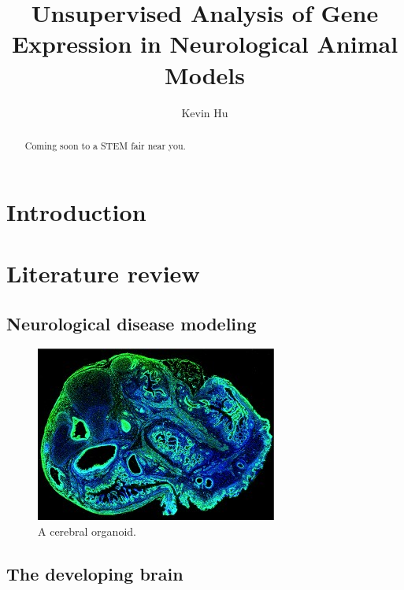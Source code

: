 \documentclass[12pt,oneside,onecolumn,a4paper]{article}
\title{Unsupervised Analysis of Gene Expression in Neurological Animal Models\vspace{-0.4cm}}
\author{Kevin Hu\vspace{-0.4cm}}
\affil{Massachusetts Academy of Math and Science\vspace{-0.4cm}}
\date{}
\begin{document}
\maketitle

\begin{abstract}
   Coming soon to a STEM fair near you.
\end{abstract}

\break
\tableofcontents
\break

\section{Introduction}

\section{Literature review}

\subsection{Neurological disease modeling}\citep{Burns_2015}\citep{Lin_2014}


\begin{figure}[h!]
\begin{center}
\includegraphics[width=0.7\columnwidth]{figures/cerebral_organoid/cerebral-organoid-for-Broad-web-300x218}
\caption{A cerebral organoid.\citep{nguyen_wang_nikolakopoulou_2015}%
}
\end{center}
\end{figure}

\subsection{The developing brain}\citep{Bakken_2015}
\end{document}
